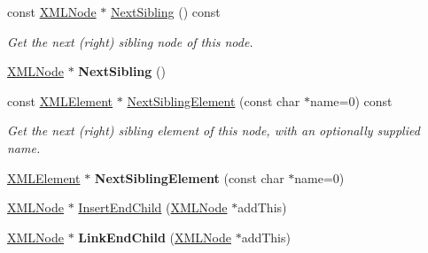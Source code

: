 \begin{DoxyCompactItemize}
\item 
const \hyperlink{classtinyxml2_1_1_x_m_l_node}{X\+M\+L\+Node} $\ast$ \hyperlink{classtinyxml2_1_1_x_m_l_node_abba1df37581d89dccc45acdc55750ba2}{Next\+Sibling} () const \hypertarget{classtinyxml2_1_1_x_m_l_node_abba1df37581d89dccc45acdc55750ba2}{}\label{classtinyxml2_1_1_x_m_l_node_abba1df37581d89dccc45acdc55750ba2}

\begin{DoxyCompactList}\small\item\em Get the next (right) sibling node of this node. \end{DoxyCompactList}\item 
\hyperlink{classtinyxml2_1_1_x_m_l_node}{X\+M\+L\+Node} $\ast$ {\bfseries Next\+Sibling} ()\hypertarget{classtinyxml2_1_1_x_m_l_node_aeb7d4dfd8fb924ef86e7cb72183acbac}{}\label{classtinyxml2_1_1_x_m_l_node_aeb7d4dfd8fb924ef86e7cb72183acbac}

\item 
const \hyperlink{classtinyxml2_1_1_x_m_l_element}{X\+M\+L\+Element} $\ast$ \hyperlink{classtinyxml2_1_1_x_m_l_node_ab66a0818d72cee86e0952ed2da701f8b}{Next\+Sibling\+Element} (const char $\ast$name=0) const \hypertarget{classtinyxml2_1_1_x_m_l_node_ab66a0818d72cee86e0952ed2da701f8b}{}\label{classtinyxml2_1_1_x_m_l_node_ab66a0818d72cee86e0952ed2da701f8b}

\begin{DoxyCompactList}\small\item\em Get the next (right) sibling element of this node, with an optionally supplied name. \end{DoxyCompactList}\item 
\hyperlink{classtinyxml2_1_1_x_m_l_element}{X\+M\+L\+Element} $\ast$ {\bfseries Next\+Sibling\+Element} (const char $\ast$name=0)\hypertarget{classtinyxml2_1_1_x_m_l_node_af1225412584d4a2126f55e96a12e0ec0}{}\label{classtinyxml2_1_1_x_m_l_node_af1225412584d4a2126f55e96a12e0ec0}

\item 
\hyperlink{classtinyxml2_1_1_x_m_l_node}{X\+M\+L\+Node} $\ast$ \hyperlink{classtinyxml2_1_1_x_m_l_node_ae3b422e98914d6002ca99bb1d2837103}{Insert\+End\+Child} (\hyperlink{classtinyxml2_1_1_x_m_l_node}{X\+M\+L\+Node} $\ast$add\+This)
\item 
\hyperlink{classtinyxml2_1_1_x_m_l_node}{X\+M\+L\+Node} $\ast$ {\bfseries Link\+End\+Child} (\hyperlink{classtinyxml2_1_1_x_m_l_node}{X\+M\+L\+Node} $\ast$add\+This)\hypertarget{classtinyxml2_1_1_x_m_l_node_a663e3a5a378169fd477378f4d17a7649}{}\label{classtinyxml2_1_1_x_m_l_node_a663e3a5a378169fd477378f4d17a7649}


\end{DoxyCompactItemize}
